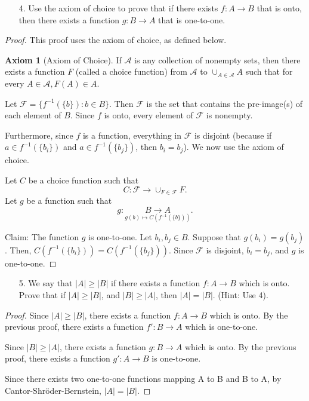 \documentclass[10pt]{article}
\theoremstyle{definition}
\newtheorem{axiom}[equation]{Axiom}
\theoremstyle{plain}
\begin{document}
\pagebreak



\begin{enumerate}
\item[4.] Use the axiom of choice to prove that if there exists $f:A \to B$ that is onto, then there exists a function $g:B \to A$ that is one-to-one.
\end{enumerate}

\begin{proof}
This proof uses the axiom of choice, as defined below.

\begin{axiom}[Axiom of Choice]
  If $\mathscr{A}$ is any collection of nonempty sets, then there exists a function $F$ (called a choice function) from $\mathscr{A}$ to $\cup_{A\in\mathscr{A}} A$ such that for every $A\in\mathscr{A}, F(A)\in A.$
\end{axiom}

Let $\mathcal{F}=\{f^{-1}(\{b\}):b\in B\}.$ Then $\mathcal{F}$ is the set that contains the pre-image(s) of each element of $B$. Since $f$ is onto, every element of $\mathcal{F}$ is nonempty.

Furthermore, since $f$ is a function, everything in $\mathcal{F}$ is disjoint (because if $a\in f^{-1}(\{b_i\})$ and $a\in f^{-1}(\{b_j\})$, then $b_i=b_j$). We now use the axiom of choice.

Let $C$ be a choice function such that
$$C:\mathcal{F}\to \cup_{F\in\mathcal{F}} F.$$
Let $g$ be a function such that
$$g:\underset{g(b) \mapsto C(f^{-1}(\{b\}))}{B \to A}.$$

Claim: The function $g$ is one-to-one.
Let $b_i, b_j\in B$. Suppose that $g(b_i)=g(b_j)$. Then, $C(f^{-1}(\{b_i\})) = C(f^{-1}(\{b_j\}))$. Since $\mathcal{F}$ is disjoint, $b_i=b_j$, and $g$ is one-to-one.
\end{proof}




\pagebreak




\begin{enumerate}
\item[5.] We say that $|A| \geq |B|$ if there exists a function $f:A \to B$ which is onto.  Prove that if $|A| \geq |B|$, and $|B| \geq |A|$, then $|A| = |B|$.  (Hint:  Use 4).
\end{enumerate}

\begin{proof}
  Since $|A| \geq |B|$, there exists a function $f:A\to B$ which is onto. By the previous proof, there exists a function $f':B\to A$ which is one-to-one.

  Since $|B| \geq |A|$, there exists a function $g:B\to A$ which is onto. By the previous proof, there exists a function $g':A\to B$ is one-to-one.

  Since there exists two one-to-one functions mapping A to B and B to A, by Cantor-Shröder-Bernstein, $|A|=|B|$.
\end{proof}
\end{document}
